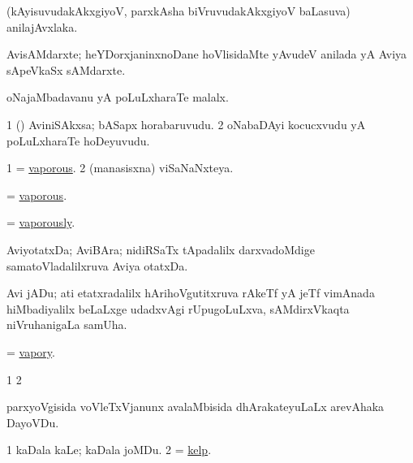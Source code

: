 \bentry
{} 
\gl{\nA}
\expl{}
\bmng
 (kAyisuvudakAkxgiyoV, parxkAsha biVruvudakAkxgiyoV baLasuva) anilajAvxlaka. 
\emng
\eentry

\bentry
{}
\gl{\nA}
\expl{}
\bmng
 AvisAMdarxte; heYDorxjaninxnoDane hoVlisidaMte yAvudeV anilada yA Aviya sApeVkaSx sAMdarxte. 
\emng
\eentry

\bentry
{} 
\gl{\nA}
\expl{}
\bmng
 oNajaMbadavanu yA poLuLxharaTe malalx. 
\emng
\eentry

\bentry
{} 
\gl{\nA}
\expl{}
\bmng
\bnum
\num{1} (\viparx) AviniSAkxsa; bASapx horabaruvudu. 
\num{2} oNabaDAyi kocucxvudu yA poLuLxharaTe hoDeyuvudu. 
\enum
\emng
\eentry

\bentry
{} 
\gl{\gu}
\expl{}
\bmng
\bnum
\num{1} = \hyperlink{vaporous}{vaporous}. 
\num{2} (manasisxna) viSaNaNxteya. 
\enum
\emng
\eentry

\bentry
{} 
\gl{\gu}
\expl{}
\bmng
 = \hyperlink{vaporous}{vaporous}. 
\emng
\eentry

\bentry
{} 
\gl{\kirxvi}
\expl{}
\bmng
 = \hyperlink{vaporously}{vaporously}. 
\emng
\eentry

\bentry
{}
\gl{\nA}
\expl{}
\bmng
 AviyotatxDa; AviBAra; nidiRSaTx tApadalilx darxvadoMdige samatoVladalilxruva Aviya otatxDa. 
\emng
\eentry

\bentry
{}
\gl{\nA}
\expl{}
\bmng
 Avi jADu; ati etatxradalilx hArihoVgutitxruva rAkeTf yA jeTf vimAnada hiMbadiyalilx beLaLxge udadxvAgi rUpugoLuLxva, sAMdirxVkaqta niVruhanigaLa samUha. 
\emng
\eentry

\bentry
{} 
\gl{\gu}
\expl{}
\bmng
 = \hyperlink{vapory}{vapory}. 
\emng
\eentry

\bentry 
{}
\gl{\saMkiSx}
\expl{}
\bmng
\bnum
\num{1}  
\num{2}  
\enum
\emng
\eentry

\bentry
{} 
\gl{\nA}
\expl{}
\bmng
 parxyoVgisida voVleTxVjanunx avalaMbisida dhArakateyuLaLx arevAhaka DayoVDu. 
\emng
\eentry

\bentry
{} 
\gl{\nA}
\expl{}
\bmng
\bnum
\num{1} kaDala kaLe; kaDala joMDu. 
\num{2} = \hyperref{kandict_k.pdf}{K}{kelp}{kelp}. 
\enum
\emng
\eentry

